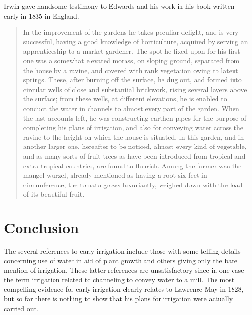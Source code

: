 Irwin gave handsome testimony to Edwards and his work in his book
written early in 1835 in England.
\begin{quote}
	In the improvement of the gardens he takes peculiar delight,
	and is very successful, having a good knowledge of
	horticulture, acquired by serving an apprenticeship to a
	market gardener.  The spot he fixed upon for his first one was
	a somewhat elevated morass, on sloping ground, separated from
	the house by a ravine, and covered with rank vegetation owing
	to latent springs.  These, after burning off the surface, he
	dug out, and formed into circular wells of close and
	substantial brickwork, rising several layers above the
	surface; from these wells, at different elevations, he is
	enabled to conduct the water in channels to almost every part
	of the garden.  When the last accounts left, he was
	constructing earthen pipes for the purpose of completing his
	plans of irrigation, and also for conveying water across the
	ravine to the height on which the house is situated.  In this
	garden, and in another larger one, hereafter to be noticed,
	almost every kind of vegetable, and as many sorts of
	fruit-trees as have been introduced from tropical and
	extra-tropical countries, are found to flourish.  Among the
	former was the mangel-wurzel, already mentioned as having a
	root six feet in circumference, the tomato grows luxuriantly,
	weighed down with the load of its beautiful
	fruit.
\end{quote}

\section*{Conclusion}

The several references to early irrigation include those with some
telling details concerning use of water in aid of plant growth and
others giving only the bare mention of irrigation. These latter
references are unsatisfactory since in one case the term irrigation
related to channeling to convey water to a mill. The most compelling evidence for early irrigation
clearly relates to Lawrence May in 1828, but so far there is nothing
to show that his plans for irrigation were actually carried out.

